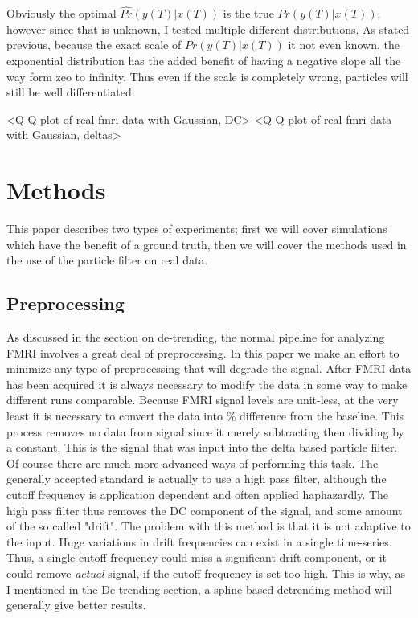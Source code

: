 \documentclass{article}
\begin{document}
Obviously the optimal $\hat{Pr}(y(T) | x(T))$ is the true $Pr(y(T) | x(T))$; however
since that is unknown, I tested multiple different distributions. As stated previous,
because the exact scale of $Pr(y(T) | x(T))$ it not even known, the exponential distribution
has the added benefit of having a negative slope all the way form zeo to infinity. Thus
even if the scale is completely wrong, particles will still be well differentiated. 

<Q-Q plot of real fmri data with Gaussian, DC>
<Q-Q plot of real fmri data with Gaussian, deltas>

\section{Methods}
This paper describes two types of experiments; first we will cover
simulations which have the benefit of a ground truth, then we will
cover the methods used in the use of the particle filter on real data.

\subsection{Preprocessing}
As discussed in the section on de-trending, the normal pipeline for analyzing
FMRI involves a great deal of preprocessing. In this paper we make an effort to
minimize any type of preprocessing that will degrade the signal. 
After FMRI data has been acquired it is always necessary to modify the
data in some way to make different runs comparable. Because FMRI signal
levels are unit-less, at the very least it is necessary to convert
the data into \% difference from the baseline. This process removes no data
from signal since it merely subtracting then dividing by a constant. This
is the signal that was input into the delta based particle filter.
Of course there are much more advanced ways of performing this task.
The generally accepted standard is actually to use a high pass filter, although the
cutoff frequency is application dependent and often applied haphazardly.
The high pass filter thus removes the DC component of the signal, and 
some amount of the so called "drift". The problem with this method is that it is
not adaptive to the input. Huge variations in drift frequencies can exist 
in a single time-series. Thus, a single cutoff frequency could miss a significant
drift component, or it could remove \emph{actual} signal, if the cutoff frequency is
set too high. This is why, as I mentioned in the De-trending section, a spline
based detrending method will generally give better results. 
\end{document}
